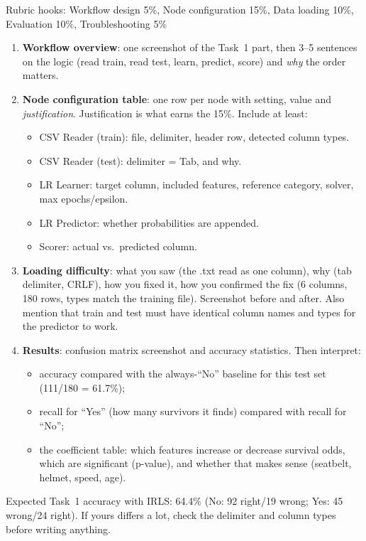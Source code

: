 \documentclass[11pt,a4paper]{article}
\begin{document}
\begin{rubric}{Rubric hooks: Workflow design 5\%, Node configuration 15\%, Data loading 10\%, Evaluation 10\%, Troubleshooting 5\%}
\begin{enumerate}
  \item \textbf{Workflow overview}: one screenshot of the Task~1 part, then 3--5 sentences on the logic
        (read train, read test, learn, predict, score) and \emph{why} the order matters.
  \item \textbf{Node configuration table}: one row per node with setting, value and \emph{justification}.
        Justification is what earns the 15\%. Include at least:
  \begin{itemize}
    \item CSV Reader (train): file, delimiter, header row, detected column types.
    \item CSV Reader (test): delimiter = Tab, and why.
    \item LR Learner: target column, included features, reference category, solver, max epochs/epsilon.
    \item LR Predictor: whether probabilities are appended.
    \item Scorer: actual vs.\ predicted column.
  \end{itemize}
  \item \textbf{Loading difficulty}: what you saw (the .txt read as one column), why (tab delimiter,
        CRLF), how you fixed it, how you confirmed the fix (6 columns, 180 rows, types match the
        training file). Screenshot before and after. Also mention that train and test must have
        identical column names and types for the predictor to work.
  \item \textbf{Results}: confusion matrix screenshot and accuracy statistics. Then interpret:
  \begin{itemize}
    \item accuracy compared with the always-``No'' baseline for this test set (111/180 = 61.7\%);
    \item recall for ``Yes'' (how many survivors it finds) compared with recall for ``No'';
    \item the coefficient table: which features increase or decrease survival odds, which are
          significant (p-value), and whether that makes sense (seatbelt, helmet, speed, age).
  \end{itemize}
\end{enumerate}
\end{rubric}
\begin{warn}
Expected Task~1 accuracy with IRLS: 64.4\% (No: 92 right/19 wrong; Yes: 45 wrong/24 right).
If yours differs a lot, check the delimiter and column types before writing anything.
\end{warn}
\end{document}
